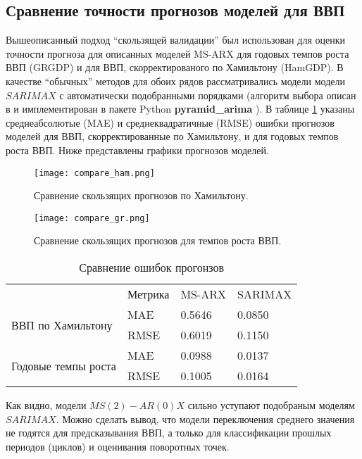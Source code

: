 \documentclass[a4paper,14pt]{extreport}
\begin{document}
	
	\subsection{Сравнение точности прогнозов моделей для ВВП}
	
	Вышеописанный подход ``скользящей валидации'' был использован для оценки точности прогноза для описанных моделей MS-ARX для годовых темпов роста ВВП (GRGDP) и для ВВП, скорректированого по Хамильтону (HamGDP). В качестве ``обычных'' методов для обоих рядов рассматривались модели модели $SARIMAX$ с автоматически подобранными порядками (алгоритм выбора описан в \cite{hynd_autoarima} и имплементирован в пакете Python \textbf{pyramid\_arima} \cite{pyramid_arima}). В таблице \ref{tbl:errors} указаны среднеабсолютые (MAE) и среднеквадратичные (RMSE) ошибки прогнозов моделей для ВВП, скорректированные по Хамильтону, и для годовых темпов роста ВВП. Ниже представлены графики прогнозов моделей.
	
	\begin{figure}
		\texttt{[image: compare\_ham.png]}
		\caption{Сравнение скользящих прогнозов по Хамильтону.}
		\label{fig:rollcompare-ham}
	\end{figure}
	
	\begin{figure}
		\texttt{[image: compare\_gr.png]}
		\caption{Сравнение скользящих прогнозов для темпов роста ВВП.}
		\label{fig:rollcompare-tr}
	\end{figure}
	
	\begin{table}[]
		\centering
		\caption{Сравнение ошибок прогонзов}
		\label{tbl:errors}
		\begin{tabular}{llll}
			& Метрика & MS-ARX & SARIMAX \\
			\multirow{2}{*}{ВВП по Хамильтону} & MAE    & 0.5646 & 0.0850  \\
			& RMSE   & 0.6019 & 0.1150  \\
			\multirow{2}{*}{Годовые темпы роста}       & MAE    & 0.0988 & 0.0137  \\
			& RMSE   & 0.1005 & 0.0164 
		\end{tabular}
	\end{table}
	
	
	Как видно, модели $MS(2)-AR(0)X$ сильно уступают подобраным моделям $SARIMAX$. Можно сделать вывод, что модели переключения среднего значения не годятся для предсказывания ВВП, а только для классификации прошлых периодов (циклов) и оценивания поворотных точек.
	
\end{document}
